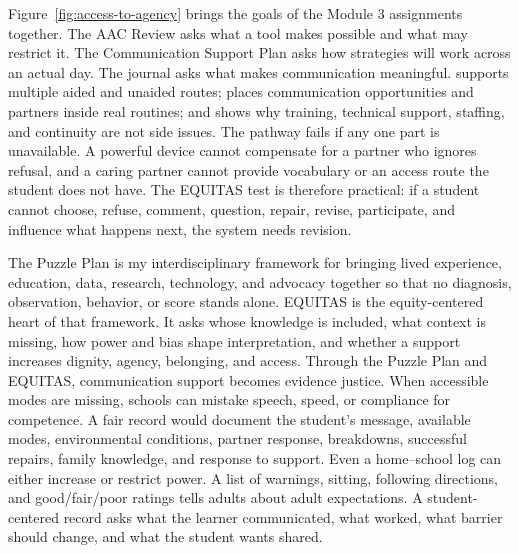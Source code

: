 Figure~\ref{fig:access-to-agency} brings the goals of the Module 3 assignments together. The AAC Review asks what a tool makes possible and what may restrict it. The Communication Support Plan asks how strategies will work across an actual day. The journal asks what makes communication meaningful. \citet{mirenda2015aids} supports multiple aided and unaided routes; \citet{downing2015classroom} places communication opportunities and partners inside real routines; and \citet{norrie2021context} shows why training, technical support, staffing, and continuity are not side issues. The pathway fails if any one part is unavailable. A powerful device cannot compensate for a partner who ignores refusal, and a caring partner cannot provide vocabulary or an access route the student does not have. The EQUITAS test is therefore practical: if a student cannot choose, refuse, comment, question, repair, revise, participate, and influence what happens next, the system needs revision.


The Puzzle Plan is my interdisciplinary framework for bringing lived experience, education, data, research, technology, and advocacy together so that no diagnosis, observation, behavior, or score stands alone. EQUITAS is the equity-centered heart of that framework. It asks whose knowledge is included, what context is missing, how power and bias shape interpretation, and whether a support increases dignity, agency, belonging, and access. Through the Puzzle Plan and EQUITAS, communication support becomes evidence justice. When accessible modes are missing, schools can mistake speech, speed, or compliance for competence. A fair record would document the student's message, available modes, environmental conditions, partner response, breakdowns, successful repairs, family knowledge, and response to support. Even a home--school log can either increase or restrict power. A list of warnings, sitting, following directions, and good/fair/poor ratings tells adults about adult expectations. A student-centered record asks what the learner communicated, what worked, what barrier should change, and what the student wants shared.
